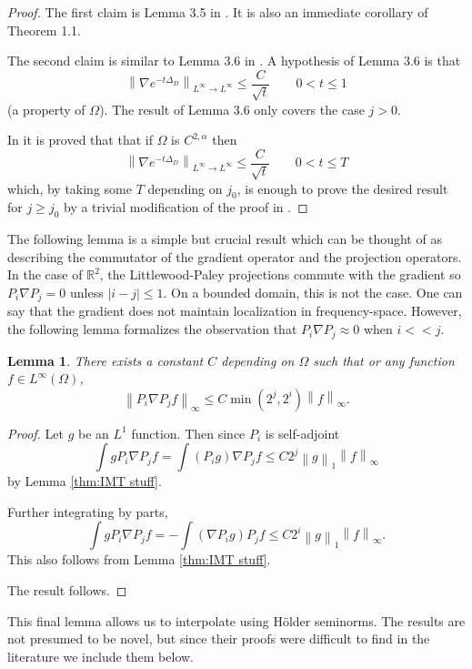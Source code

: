 \documentclass[11pt]{amsart}
\newtheorem{lemma}[theorem]{Lemma}
\theoremstyle{remark}
\theoremstyle{definition}
\newcommand{\R}{\mathbb{R}}
\newcommand{\norm}[1]{\left\lVert#1\right\rVert}
\newcommand{\grad}{\nabla}
\newcommand{\Laplace}{\Delta}
\begin{document}
\begin{proof}
The first claim is Lemma 3.5 in \cite{IMTb}.  It is also an immediate corollary of \cite{IMTs} Theorem 1.1.  

The second claim is similar to Lemma 3.6 in \cite{IMTb}.  A hypothesis of Lemma 3.6 is that
\[ \norm{\grad e^{-t\Laplace_D}}_{L^\infty \to L^\infty} \leq \frac{C}{\sqrt{t}} \qquad 0 < t \leq 1 \]
(a property of $\Omega$).  The result of Lemma 3.6 only covers the case $j > 0$.  

In \cite{FMP} it is proved that that if $\Omega$ is $C^{2,\alpha}$ then
\[ \norm{\grad e^{-t\Laplace_D}}_{L^\infty \to L^\infty} \leq \frac{C}{\sqrt{t}} \qquad 0 < t \leq T \]
which, by taking some $T$ depending on $j_0$, is enough to prove the desired result for $j \geq j_0$ by a trivial modification of the proof in \cite{IMTb}.  
\end{proof}

The following lemma is a simple but crucial result which can be thought of as describing the commutator of the gradient operator and the projection operators.  In the case of $\R^2$, the Littlewood-Paley projections commute with the gradient so $P_i \grad P_j = 0$ unless $|i-j|\leq 1$.  On a bounded domain, this is not the case.  One can say that the gradient does not maintain localization in frequency-space.  However, the following lemma formalizes the observation that $P_i \grad P_j \approx 0$ when $i << j$.  

\begin{lemma} \label{thm:grad and proj}
There exists a constant $C$ depending on $\Omega$ such that or any function $f \in L^\infty(\Omega)$,
\[ \norm{P_i \grad P_j f}_\infty \leq C \min(2^j,2^i) \norm{f}_\infty. \]
\end{lemma}
\begin{proof}
Let $g$ be an $L^1$ function.  Then since $P_i$ is self-adjoint
\[ \int g P_i \grad P_j f = \int (P_i g) \grad P_j f \leq C 2^j \norm{g}_1 \norm{f}_\infty \]
by Lemma \ref{thm:IMT stuff}.  

Further integrating by parts,
\[ \int g P_i \grad P_j f = - \int (\grad P_i g) P_j f \leq C 2^i \norm{g}_1 \norm{f}_\infty. \]
This also follows from Lemma \ref{thm:IMT stuff}.  

The result follows.  
\end{proof}


This final lemma allows us to interpolate using H\"{o}lder seminorms.  The results are not presumed to be novel, but since their proofs were difficult to find in the literature we include them below.  
\end{document}
